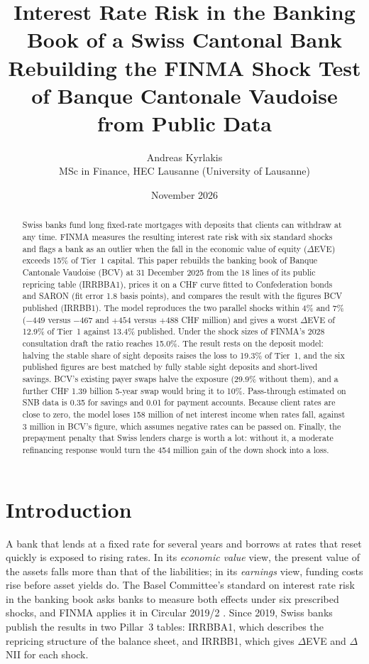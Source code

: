 \documentclass[11pt,a4paper]{article}
\title{Interest Rate Risk in the Banking Book of a Swiss Cantonal Bank\\
\large Rebuilding the FINMA Shock Test of Banque Cantonale Vaudoise from Public Data}
\author{Andreas Kyrlakis\\
\small MSc in Finance, HEC Lausanne (University of Lausanne)}
\date{November 2026}
\newcommand{\dEVE}{$\Delta$EVE}
\newcommand{\dNII}{$\Delta$NII}
\begin{document}
\maketitle

\begin{abstract}
\noindent
Swiss banks fund long fixed-rate mortgages with deposits that clients can withdraw at any time. FINMA measures the resulting interest rate risk with six standard shocks and flags a bank as an outlier when the fall in the economic value of equity (\dEVE) exceeds 15\% of Tier~1 capital. This paper rebuilds the banking book of Banque Cantonale Vaudoise (BCV) at 31 December 2025 from the 18 lines of its public repricing table (IRRBBA1), prices it on a CHF curve fitted to Confederation bonds and SARON (fit error 1.8 basis points), and compares the result with the figures BCV published (IRRBB1). The model reproduces the two parallel shocks within 4\% and 7\% ($-449$ versus $-467$ and $+454$ versus $+488$ CHF million) and gives a worst \dEVE{} of 12.9\% of Tier~1 against 13.4\% published. Under the shock sizes of FINMA's 2028 consultation draft the ratio reaches 15.0\%. The result rests on the deposit model: halving the stable share of sight deposits raises the loss to 19.3\% of Tier~1, and the six published figures are best matched by fully stable sight deposits and short-lived savings. BCV's existing payer swaps halve the exposure (29.9\% without them), and a further CHF 1.39 billion 5-year swap would bring it to 10\%. Pass-through estimated on SNB data is 0.35 for savings and 0.01 for payment accounts. Because client rates are close to zero, the model loses 158 million of net interest income when rates fall, against 3 million in BCV's figure, which assumes negative rates can be passed on. Finally, the prepayment penalty that Swiss lenders charge is worth a lot: without it, a moderate refinancing response would turn the 454 million gain of the down shock into a loss.
\end{abstract}

\section{Introduction}

A bank that lends at a fixed rate for several years and borrows at rates that reset quickly is exposed to rising rates. In its \emph{economic value} view, the present value of the assets falls more than that of the liabilities; in its \emph{earnings} view, funding costs rise before asset yields do. The Basel Committee's standard on interest rate risk in the banking book \citep[IRRBB,][]{bcbs2016} asks banks to measure both effects under six prescribed shocks, and FINMA applies it in Circular 2019/2 \citep{finma2019}. Since 2019, Swiss banks publish the results in two Pillar~3 tables: IRRBBA1, which describes the repricing structure of the balance sheet, and IRRBB1, which gives \dEVE{} and \dNII{} for each shock.
\end{document}

